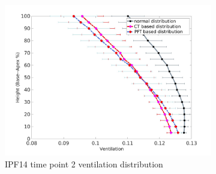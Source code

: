 \begin{figure}[htbp]  
\centering
\begin{subfigure}{.6\linewidth}%
  \includegraphics[width=\linewidth,trim={{.0\wd0} {.0\wd0} {.0\wd0} {.0\wd0}},clip]{Appendix/Image_AppexB/IPF1402/IPF1402_VentilationAgainstLungHeight.png} %
  \caption{IPF14 time point 2 ventilation distribution}
  \label{fig:IPF1402VQDistribution-a} 
\end{subfigure} 
\begin{subfigure}{.6\linewidth}%

\end{subfigure}
\end{figure}

